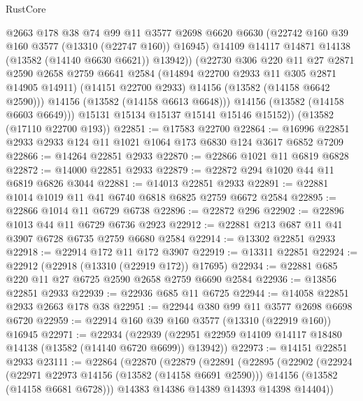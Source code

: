 \begin{lexlean}{RustCore}
\begin{coremodule}
                @2663
                @178
                @38
                @74
                @99
                @11
                @3577
                @2698
                @6620
                @6630
                (@22742 @160 @39 @160 @3577 (@13310 (@22747 @160)) @16945)
                @14109
                @14117
                @14871
                @14138
                (@13582 (@14140 @6630 @6621))
                @13942))
            (@22730
              @306
              @220
              @11
              @27
              @2871
              @2590
              @2658
              @2759
              @6641
              @2584
              (@14894 @22700 @2933 @11 @305 @2871 @14905 @14911)
              (@14151 @22700 @2933)
              @14156
              (@13582 (@14158 @6642 @2590)))
            @14156
            (@13582 (@14158 @6613 @6648)))
          @14156
          (@13582 (@14158 @6603 @6649)))
        @15131
        @15134
        @15137
        @15141
        @15146
        @15152))
    (@13582 (@17110 @22700 @193))
@22851 := @17583 @22700
@22864 := @16996 @22851 @2933 @2933 @124 @11 @1021 @1064 @173 @6830 @124 @3617 @6852 @7209
@22866 := @14264 @22851 @2933
@22870 := @22866 @1021 @11 @6819 @6828
@22872 := @14000 @22851 @2933
@22879 := @22872 @294 @1020 @44 @11 @6819 @6826 @3044
@22881 := @14013 @22851 @2933
@22891 := @22881 @1014 @1019 @11 @41 @6740 @6818 @6825 @2759 @6672 @2584
@22895 := @22866 @1014 @11 @6729 @6738
@22896 := @22872 @296
@22902 := @22896 @1013 @44 @11 @6729 @6736 @2923
@22912 := @22881 @213 @687 @11 @41 @3907 @6728 @6735 @2759 @6680 @2584
@22914 := @13302 @22851 @2933
@22918 := @22914 @172 @11 @172 @3907
@22919 := @13311 @22851
@22924 := @22912 (@22918 (@13310 (@22919 @172)) @17695)
@22934 := @22881 @685 @220 @11 @27 @6725 @2590 @2658 @2759 @6690 @2584
@22936 := @13856 @22851 @2933
@22939 := @22936 @685 @11 @6725
@22944 := @14058 @22851 @2933 @2663 @178 @38
@22951 := @22944 @380 @99 @11 @3577 @2698 @6698 @6720
@22959 := @22914 @160 @39 @160 @3577 (@13310 (@22919 @160)) @16945
@22971 := @22934
    (@22939 (@22951 @22959 @14109 @14117 @18480 @14138 (@13582 (@14140 @6720 @6699)) @13942))
@22973 := @14151 @22851 @2933
@23111 := @22864
    (@22870
      (@22879
        (@22891
          (@22895
            (@22902
              (@22924
                (@22971 @22973 @14156 (@13582 (@14158 @6691 @2590)))
                @14156
                (@13582 (@14158 @6681 @6728)))
              @14383
              @14386
              @14389
              @14393
              @14398
              @14404))

\end{coremodule}
\end{lexlean}
